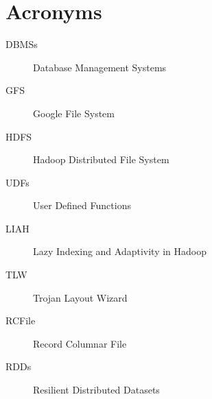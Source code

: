 
\chapter*{Acronyms}

\begin{singlespace}

\begin{description}

\item[DBMSs]{Database Management Systems}

\item[GFS]{Google File System}

\item[HDFS]{Hadoop Distributed File System}

\item[UDFs]{User Defined Functions}

\item[LIAH]{Lazy Indexing and Adaptivity in Hadoop}

\item[TLW]{Trojan Layout Wizard}

\item[RCFile]{Record Columnar File}

\item[RDDs]{Resilient Distributed Datasets}

\end{description}

\end{singlespace}
